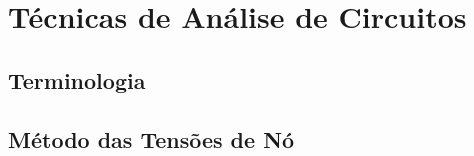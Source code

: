 \chapter{Técnicas de Análise de Circuitos}

\section{Terminologia}

\section{Método das Tensões de Nó}